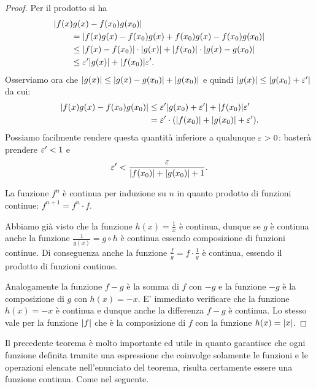 \begin{proof}
Per il prodotto si ha
\begin{align*}
  \MoveEqLeft \abs{f(x)g(x)-f(x_0)g(x_0)}\\
  &= \abs{f(x)g(x) - f(x_0)g(x) + f(x_0)g(x) - f(x_0)g(x_0)}\\
  &\le \abs{f(x)-f(x_0)}\cdot\abs{g(x)} + \abs{f(x_0)}\cdot \abs{g(x)-g(x_0)} \\
  &\le \eps' \abs{g(x)} + \abs{f(x_0)} \eps'.
\end{align*}
Osserviamo ora che ${\left|g(x)\right|}\le {\left|g(x)-g(x_0)\right|} + {\left|g(x_0)\right|}$
e quindi ${\left|g(x)\right|}\le {\left|g(x_0)+\varepsilon'\right|}$ da cui:
\begin{align*}
  {\left|f(x)g(x)-f(x_0)g(x_0)\right|}
  &\le \varepsilon' {\left|g(x_0)+\varepsilon'\right|} + {\left|f(x_0)\right|} \varepsilon' \\
  &= \varepsilon' \cdot({\left|f(x_0)\right|} + {\left|g(x_0)\right|} + \varepsilon').
\end{align*}
Possiamo facilmente rendere questa quantità inferiore a
qualunque $\varepsilon>0$: basterà prendere $\varepsilon'<1$ e
\[
  \varepsilon' < \frac{\varepsilon}{{\left|f(x_0)\right|} + {\left|g(x_0)\right|} + 1}.
\]

La funzione $f^n$ è continua per induzione su $n$
in quanto prodotto di funzioni
continue: $f^{n+1} = f^{n} \cdot f$.

Abbiamo già visto che la funzione $h(x) = \frac{1}{x}$ è continua,
dunque se $g$ è continua anche la funzione $\frac{1}{g(x)} = g\circ h$
è continua essendo composizione di funzioni continue. Di conseguenza anche la funzione $\frac{f}{g} = f \cdot \frac{1}{g}$
è continua, essendo il prodotto di funzioni continue.

Analogamente la funzione $f-g$ è la somma di $f$ con $-g$ e
la funzione $-g$ è la composizione di $g$ con $h(x)=-x$.
E' immediato verificare che la funzione $h(x)=-x$ è continua
e dunque anche la differenza $f-g$ è continua.
Lo stesso vale per la funzione ${\left|f\right|}$ che è la composizione
di $f$ con la funzione $h(x) = {\left|x\right|}$.
\end{proof}

Il precedente teorema è molto importante ed utile in quanto
garantisce che ogni funzione definita tramite una espressione
che coinvolge solamente le funzioni e le operazioni
elencate nell'enunciato del teorema, risulta certamente
essere una funzione continua. Come nel seguente.

